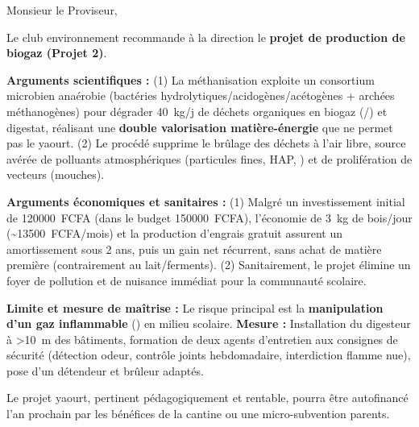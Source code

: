 \documentclass[11pt]{article}
\begin{document}
\begin{exoresolu}
\begin{exemplebox}
Monsieur le Proviseur,

Le club environnement recommande à la direction le \textbf{projet de production de biogaz (Projet 2)}.

\textbf{Arguments scientifiques :} (1) La méthanisation exploite un consortium microbien anaérobie (bactéries hydrolytiques/acidogènes/acétogènes + archées méthanogènes) pour dégrader \SI{40}{kg/j} de déchets organiques en biogaz (/) et digestat, réalisant une \textbf{double valorisation matière-énergie} que ne permet pas le yaourt. (2) Le procédé supprime le brûlage des déchets à l'air libre, source avérée de polluants atmosphériques (particules fines, HAP, ) et de prolifération de vecteurs (mouches).

\textbf{Arguments économiques et sanitaires :} (1) Malgré un investissement initial de \SI{120000}{FCFA} (dans le budget \SI{150000}{FCFA}), l'économie de \SI{3}{kg} de bois/jour (\textasciitilde \SI{13500}{FCFA}/mois) et la production d'engrais gratuit assurent un amortissement sous 2 ans, puis un gain net récurrent, sans achat de matière première (contrairement au lait/ferments). (2) Sanitairement, le projet élimine un foyer de pollution et de nuisance immédiat pour la communauté scolaire.

\textbf{Limite et mesure de maîtrise :} Le risque principal est la \textbf{manipulation d'un gaz inflammable} () en milieu scolaire. \textbf{Mesure :} Installation du digesteur à \textgreater \SI{10}{m} des bâtiments, formation de deux agents d'entretien aux consignes de sécurité (détection odeur, contrôle joints hebdomadaire, interdiction flamme nue), pose d'un détendeur et brûleur adaptés.

Le projet yaourt, pertinent pédagogiquement et rentable, pourra être autofinancé l'an prochain par les bénéfices de la cantine ou une micro-subvention parents.
\end{exemplebox}
\end{exoresolu}
\end{document}
